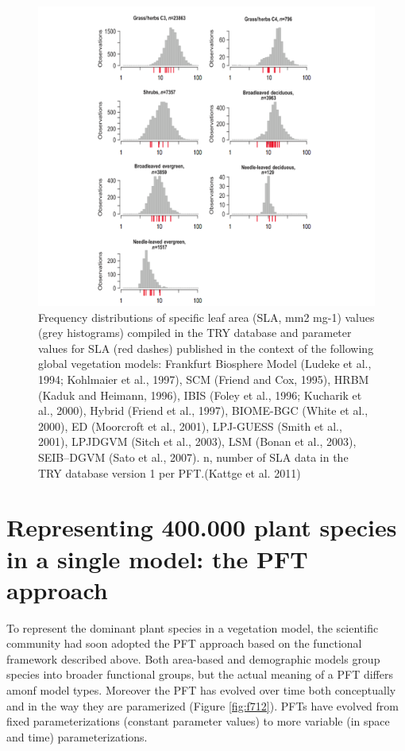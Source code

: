 \documentclass[12pt,oneside]{book}
\begin{document}
\begin{figure}

{\centering \includegraphics[width=0.8\linewidth]{figures/chap7/f711_try_models} 

}

\caption{Frequency distributions of specific leaf area (SLA, mm2 mg-1) values (grey histograms) compiled in the TRY database and parameter values for SLA (red dashes) published in the context of the following global vegetation models: Frankfurt Biosphere Model (Ludeke et al., 1994; Kohlmaier et al., 1997), SCM (Friend and Cox, 1995), HRBM (Kaduk and Heimann, 1996), IBIS (Foley et al., 1996; Kucharik et al., 2000), Hybrid (Friend et al., 1997), BIOME-BGC (White et al., 2000), ED (Moorcroft et al., 2001), LPJ-GUESS (Smith et al., 2001), LPJDGVM (Sitch et al., 2003), LSM (Bonan et al., 2003), SEIB–DGVM (Sato et al., 2007). n, number of SLA data in the TRY database version 1 per PFT.(Kattge et al. 2011)}\label{fig:f711}
\end{figure}

\section{Representing 400.000 plant species in a single model: the PFT
approach}\label{representing-400.000-plant-species-in-a-single-model-the-pft-approach}

To represent the dominant plant species in a vegetation model, the
scientific community had soon adopted the PFT approach based on the
functional framework described above. Both area-based and demographic
models group species into broader functional groups, but the actual
meaning of a PFT differs amonf model types. Moreover the PFT has evolved
over time both conceptually and in the way they are paramerized (Figure
\ref{fig:f712}). PFTs have evolved from fixed parameterizations
(constant parameter values) to more variable (in space and time)
parameterizations.
\end{document}

